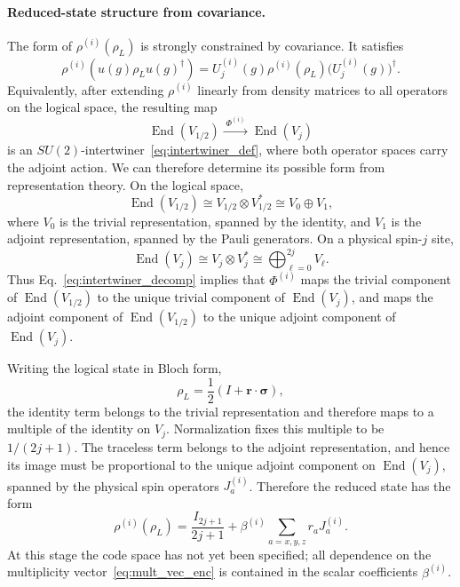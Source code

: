 \documentclass[10pt,twocolumn,superscriptaddress,aps,amsmath,amssymb,citeautoscript,floatfix,prx]{revtex4-2}
\theoremstyle{plain}
\theoremstyle{plain}
\theoremstyle{plain}
\theoremstyle{plain}
\theoremstyle{plain}
\theoremstyle{plain}
\begin{document}
\paragraph{Reduced-state structure from covariance.}
The form of $\rho^{(i)}(\rho_L)$ is strongly constrained by covariance. It satisfies
\begin{equation}\label{eq:reduced-state_cov_cond}
    \rho^{(i)}\!\left(u(g)\rho_Lu(g)^\dagger\right)
    =
    U_j^{(i)}(g)\rho^{(i)}(\rho_L)\bigl(U_j^{(i)}(g)\bigr)^\dagger .
\end{equation}
Equivalently, after extending $\rho^{(i)}$ linearly from density matrices to all operators on the logical space, the resulting map
\[
    \operatorname{End}(V_{1/2})
    \xrightarrow{\;\Phi^{(i)}\;}
    \operatorname{End}(V_j)
\]
is an $SU(2)$-intertwiner~\eqref{eq:intertwiner_def}, where both operator spaces carry the adjoint action. We can therefore determine its possible form from representation theory. On the logical space,
\[
    \operatorname{End}(V_{1/2})
    \cong
    V_{1/2}\otimes V_{1/2}^*
    \cong
    V_0\oplus V_1,
\]
where $V_0$ is the trivial representation, spanned by the identity, and $V_1$ is the adjoint representation, spanned by the Pauli generators. On a physical spin-$j$ site,
\[
    \operatorname{End}(V_j)
    \cong
    V_j\otimes V_j^*
    \cong
    \bigoplus_{\ell=0}^{2j} V_\ell .
\]
Thus Eq.~\eqref{eq:intertwiner_decomp} implies that $\Phi^{(i)}$ maps the trivial component of $\operatorname{End}(V_{1/2})$ to the unique trivial component of $\operatorname{End}(V_j)$, and maps the adjoint component of $\operatorname{End}(V_{1/2})$ to the unique adjoint component of $\operatorname{End}(V_j)$.

Writing the logical state in Bloch form,
\[
    \rho_L=\frac12(I+\mathbf r\cdot\boldsymbol\sigma),
\]
the identity term belongs to the trivial representation and therefore maps to a multiple of the identity on $V_j$. Normalization fixes this multiple to be $1/(2j+1)$. The traceless term belongs to the adjoint representation, and hence its image must be proportional to the unique adjoint component on $\operatorname{End}(V_j)$, spanned by the physical spin operators $J_a^{(i)}$. Therefore the reduced state has the form
\begin{equation}\label{eq:reduced_state_beta}
    \rho^{(i)}(\rho_L)
    =
    \frac{I_{2j+1}}{2j+1}
    +
    \beta^{(i)}
    \sum_{a=x,y,z} r_a J_a^{(i)} .
\end{equation}
At this stage the code space has not yet been specified; all dependence on the multiplicity vector~\eqref{eq:mult_vec_enc} is contained in the scalar coefficients $\beta^{(i)}$.
\end{document}
